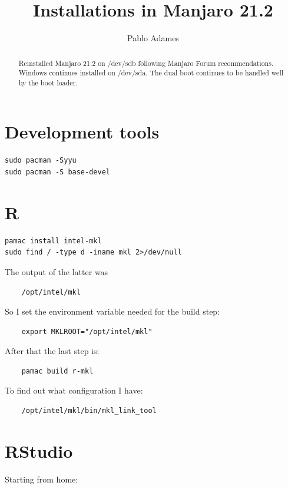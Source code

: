 \documentclass[]{scrartcl}
\title{Installations in Manjaro 21.2}
\author{Pablo Adames}
\begin{document}
\maketitle

\begin{abstract}
Reinstalled Manjaro 21.2 on /dev/sdb following Manjaro Forum recommendations.
Windows continues installed on /dev/sda.
The dual boot continues to be handled well by the boot loader.
\end{abstract}

\section{Development tools}

\begin{verbatim}
sudo pacman -Syyu
sudo pacman -S base-devel
\end{verbatim}

\section{R}

\begin{verbatim}
pamac install intel-mkl
sudo find / -type d -iname mkl 2>/dev/null
\end{verbatim}

The output of the latter was
\begin{verbatim}
	/opt/intel/mkl
\end{verbatim}

So I set the environment variable needed for the build step:

\begin{verbatim}
	export MKLROOT="/opt/intel/mkl"
\end{verbatim}

After that the last step is:

\begin{verbatim}
	pamac build r-mkl
\end{verbatim}

To find out what configuration I have:
\begin{verbatim}
	/opt/intel/mkl/bin/mkl_link_tool
\end{verbatim} 


\section{RStudio}

Starting from home:
\end{document}

